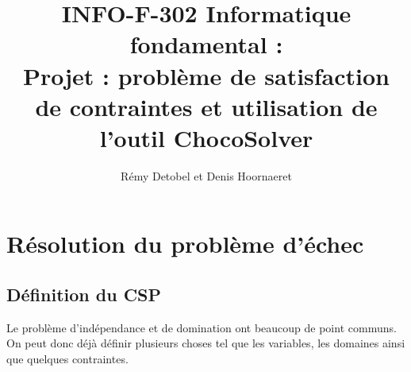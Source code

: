 \documentclass[a4paper,11pt]{article}
\title{INFO-F-302 Informatique fondamental :\\Projet : problème de satisfaction de contraintes et utilisation de l'outil ChocoSolver}
\author{Rémy Detobel et Denis Hoornaeret}
\begin{document}
\maketitle
\setcounter{tocdepth}{2}
\tableofcontents


%

\newpage

\section{Résolution du problème d'échec}
    
    \subsection{Définition du CSP}
        Le problème d'indépendance et de domination ont beaucoup de point communs. On peut donc déjà définir plusieurs choses tel que les variables, les domaines ainsi que quelques contraintes. 
        
\end{document}
